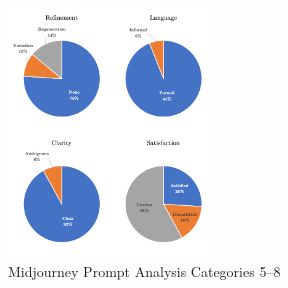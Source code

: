 \begin{figure}
    \centering
    \includegraphics[width=0.475\textwidth]{images/charts4}
    \caption{Midjourney Prompt Analysis Categories 5--8}
    \label{fig:midjourney-categories-2}
\end{figure}

